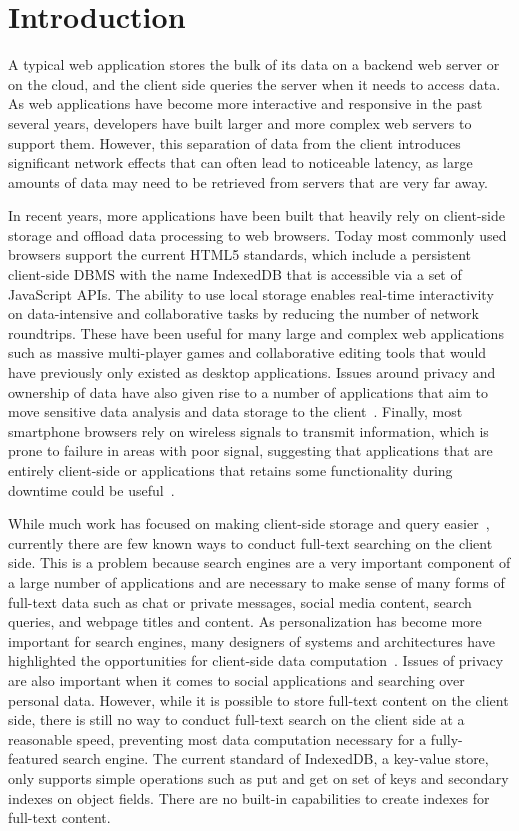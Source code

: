 \documentclass{vldb}
\begin{document}
\section{Introduction}

A typical web application stores the bulk of its data on a backend web server or on the cloud, and the client side queries the server when it needs to access data.
As web applications have become more interactive and responsive in the past several years, developers have built larger and more complex web servers to support them. However, this separation of data from the client introduces significant network effects that can often lead to noticeable latency, as large amounts of data may need to be retrieved from servers that are very far away. 

In recent years, more applications have been built that heavily rely on client-side storage and offload data processing to web browsers. Today most commonly used browsers support the current HTML5 standards, which include a persistent client-side DBMS with the name IndexedDB that is accessible via a set of JavaScript APIs. 
The ability to use local storage enables real-time interactivity on data-intensive and collaborative tasks by reducing the number of network roundtrips.
These have been useful for many large and complex web applications such as massive multi-player games and collaborative editing tools that would have previously only existed as desktop applications.
Issues around privacy and ownership of data have also given rise to a number of applications that aim to move sensitive data analysis and data storage to the client~\cite{bilenko2011predictive, khoshgozaran2009private}. 
Finally, most smartphone browsers rely on wireless signals to transmit information, which is prone to failure in areas with poor signal, suggesting that applications that are entirely client-side or applications that retains some functionality during downtime could be useful~\cite{balasubramanian2012findall}.

While much work has focused on making client-side storage and query easier~\cite{benson2010sync}, currently there are few known ways to conduct full-text searching on the client side. This is a problem because search engines are a very important component of a large number of applications and are necessary to make sense of many forms of full-text data such as chat or private messages, social media content, search queries, and webpage titles and content. 
As personalization has become more important for search engines, many designers of systems and architectures have highlighted the opportunities for client-side data computation~\cite{bharat2000searchpad,teevan2005personalizing}.
Issues of privacy are also important when it comes to social applications and searching over personal data.
However, while it is possible to store full-text content on the client side, there is still no way to conduct full-text search on the client side at a reasonable speed, preventing most data computation necessary for a fully-featured search engine.
The current standard of IndexedDB, a key-value store, only supports simple operations such as put and get on set of keys and secondary indexes on object fields. There are no built-in capabilities to create indexes for full-text content. 
\end{document}

